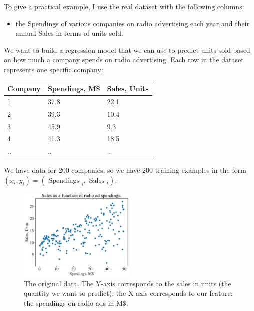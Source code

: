 \documentclass[9pt,dvipsnames]{beamer}
\begin{document}
\begin{frame}
	To give a practical example, I use the real dataset with the following columns:
	\begin{itemize}
		\item the Spendings of various companies on radio advertising each year and their annual Sales in terms of units sold.
	\end{itemize}
 We want to build a regression model that we can use to predict units sold based on how much a company spends on radio advertising. Each row in the dataset represents one specific company:
 \begin{center}
 	 \begin{tabular}{lll}
 		\hline Company & Spendings, M\$ & Sales, Units \\
 		\hline 1 & 37.8 & 22.1 \\
 		2 & 39.3 & 10.4 \\
 		3 & 45.9 & 9.3 \\
 		4 & 41.3 & 18.5 \\
 		.. &.. &.. \\
 		\hline
 	\end{tabular}
 \end{center}
\end{frame}

\begin{frame}
	We have data for 200 companies, so we have 200 training examples in the form $\left(x_{i}, y_{i}\right) = \left(\text { Spendings }_{i}, \text { Sales }_{i}\right)$. 
	\begin{figure}
		\centering
		\includegraphics[width=0.5\textwidth]{imgs/ana_ml_1.jpeg}
		\caption{The original data. The Y-axis corresponds to the sales in units (the quantity we want to predict), the $\mathrm{X}$-axis corresponds to our feature: the spendings on radio ads in $\mathrm{M} \$$.}
	\end{figure}
\end{frame}
\end{document}
